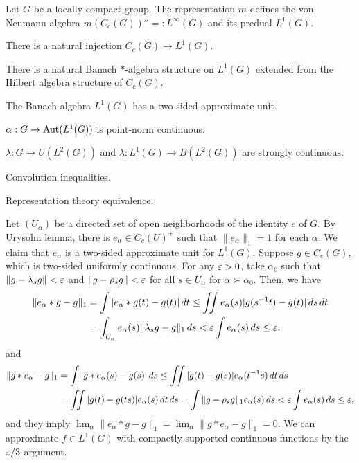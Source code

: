 \documentclass{../../large}
\begin{document}
\begin{prb}
Let $G$ be a locally compact group.
The representation $m$ defines the von Neumann algebra $m(C_c(G))''=:L^\infty(G)$ and its predual $L^1(G)$.
\begin{parts}
\item There is a natural injection $C_c(G)\to L^1(G)$.
\item There is a natural Banach $*$-algebra structure on $L^1(G)$ extended from the Hilbert algebra structure of $C_c(G)$.
\item The Banach algebra $L^1(G)$ has a two-sided approximate unit.
\item $\alpha:G\to\operatorname{Aut}(L^1(G))$ is point-norm continuous.
\item $\lambda:G\to U(L^2(G))$ and $\lambda:L^1(G)\to B(L^2(G))$ are strongly continuous.
\item Convolution inequalities.
\item Representation theory equivalence.
\end{parts}
\begin{pf}
Let $(U_\alpha)$ be a directed set of open neighborhoods of the identity $e$ of $G$.
By Urysohn lemma, there is $e_\alpha\in C_c(U)^+$ such that $\|e_\alpha\|_1=1$ for each $\alpha$.
We claim that $e_\alpha$ is a two-sided approximate unit for $L^1(G)$.
Suppose $g\in C_c(G)$, which is two-sided uniformly continuous.
For any $\varepsilon>0$, take $\alpha_0$ such that $\|g-\lambda_sg\|<\varepsilon$ and $\|g-\rho_sg\|<\varepsilon$ for all $s\in U_\alpha$ for $\alpha\succ\alpha_0$.
Then, we have
\begin{align*}
\|e_\alpha*g-g\|_1
&=\int|e_\alpha*g(t)-g(t)|\,dt\le\iint e_\alpha(s)|g(s^{-1}t)-g(t)|\,ds\,dt\\
&=\int_{U_\alpha}e_\alpha(s)\|\lambda_sg-g\|_1\,ds<\varepsilon\int e_\alpha(s)\,ds\le\varepsilon,
\end{align*}
and
\begin{align*}
\|g*e_\alpha-g\|_1
&=\int|g*e_\alpha(s)-g(s)|\,ds\le\iint|g(t)-g(s)|e_\alpha(t^{-1}s)\,dt\,ds\\
&=\iint|g(t)-g(ts)|e_\alpha(s)\,dt\,ds=\int\|g-\rho_sg\|_1e_\alpha(s)\,ds<\varepsilon\int e_\alpha(s)\,ds\le\varepsilon,
\end{align*}
and they imply $\lim_\alpha\|e_\alpha*g-g\|_1=\lim_\alpha\|g*e_\alpha-g\|_1=0$.
We can approximate $f\in L^1(G)$ with compactly supported continuous functions by the $\varepsilon/3$ argument.
\end{pf}

\end{prb}
\end{document}

